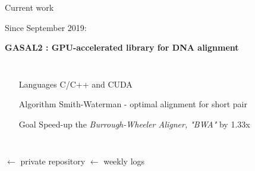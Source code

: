 
\begin{frame}{Current work}

	\begin{center}
		Since September 2019:
		
		\textbf{GASAL2 : GPU-accelerated library for DNA alignment}
	
	\begin{columns}
		\begin{itemize}
			\item[Languages] C/C++ and CUDA
			\item[Algorithm] Smith-Waterman - optimal alignment for short pair
			\item[Goal] Speed-up the \emph{Burrough-Wheeler Aligner, "BWA"} by 1.33x
		\end{itemize}	
	\end{columns}

	\bigskip
	\end{center}
	 $\leftarrow$ private repository
	 $\leftarrow$ weekly logs
	
\end{frame}